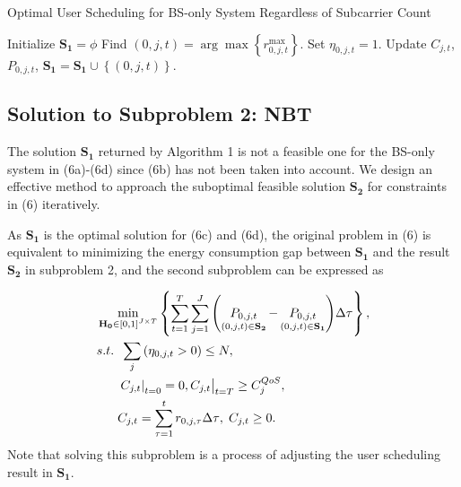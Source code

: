 \documentclass{ieeeaccess}
\begin{document}
\begin{algorithm}[h]
\caption{Optimal User Scheduling for BS-only System Regardless of Subcarrier Count}
\label{alg:1}
\begin{algorithmic}[1]
\STATE Initialize ${{\mathbf{S}}_{\mathbf{1}}}=\phi$
    \STATE Find $\left( {0,j,t} \right) = \arg \max \left\{ {r_{0,j,t}^{\max }} \right\}$.
    \STATE Set ${\eta _{0,j,t}} = 1$.
    \STATE Update ${C_{j,t}}$, ${P_{0,j,t}}$, ${{\mathbf{S}}_{\mathbf{1}}}={{\mathbf{S}}_{\mathbf{1}}} \cup \left\{ {\left( {0,j,t} \right)} \right\}$.
  \ENDWHILE
\ENDFOR
\end{algorithmic}
\end{algorithm}



\subsection{Solution to \textbf{Subproblem 2: NBT}}

The solution ${{\mathbf{S}}_{\mathbf{1}}}$ returned by Algorithm 1 is not a feasible one for the BS-only system in (6a)-(6d) since (6b) has not been taken into account. We design an effective method to approach the suboptimal feasible solution ${{\mathbf{S}}_{\mathbf{2}}}$ for constraints in (6) iteratively.

As ${{\mathbf{S}}_{\mathbf{1}}}$ is the optimal solution for (6c) and (6d), the original problem in (6) is equivalent to minimizing the energy consumption gap between ${{\mathbf{S}}_{\mathbf{1}}}$ and the result ${{\mathbf{S}}_{\mathbf{2}}}$ in subproblem 2, and the second subproblem can be expressed as

\begin{subequations}
\begin{align}
& \mathop {\min }\limits_{{{\mathbf{{\rm H}}}_{\mathbf{0}}} \in {{\left[ {0,1} \right]}^{J \times T}}} \left\{ {\sum\limits_{t = 1}^T {\sum\limits_{j = 1}^J {\left( {\mathop {{P_{0,j,t}}}\limits_{\left( {0,j,t} \right) \in {{\mathbf{S}}_{\mathbf{2}}}}  - \mathop {{P_{0,j,t}}}\limits_{\left( {0,j,t} \right) \in {{\mathbf{S}}_{\mathbf{1}}}} } \right)} \Delta \tau } } \right\}, \\
& {s.t.} \;\; \sum\limits_j  {\left( {{\eta _{0,j,t}} > 0} \right)}  \le N, \\
& \;\;\;\;\;\; {\left. {{{\left. {{C_{j,t}}} \right|}_{t = 0}} = 0, {C_{j,t}}} \right|_{t = T}} \ge C_j^{QoS}, \\
& \;\;\;\;\;\; {C_{j,t}} = \sum\limits_{\tau  = 1}^t {{r_{0,j,\tau }}\Delta \tau } ,\; {C_{j,t}} \ge 0.
\end{align}
\end{subequations}
Note that solving this subproblem is a process of adjusting the user scheduling result in ${{\mathbf{S}}_{\mathbf{1}}}$.
\end{document}
